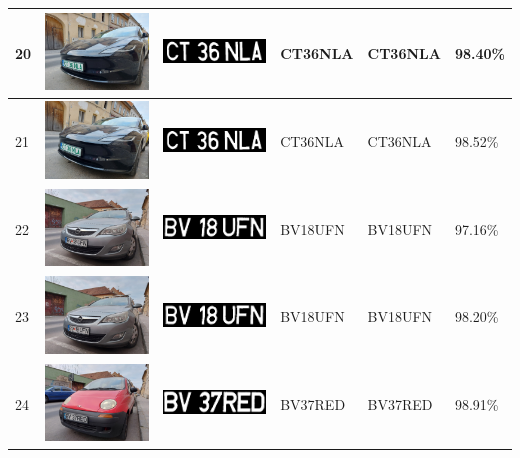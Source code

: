 \documentclass[a4paper,12pt]{report}
\begin{document}
\begin{longtable}{| m{0.6cm} | m{3cm} | m{3cm} | m{1.8cm} | m{1.8cm} | m{1.8cm} |}
        20 & \includegraphics[width=3cm,keepaspectratio]{dataset/10_d2.jpg} & \includegraphics[width=3cm,keepaspectratio]{segmentari/20.jpg} & CT36NLA & CT36NLA & 98.40\% \\ \hline
        21 & \includegraphics[width=3cm,keepaspectratio]{dataset/10_d3.jpg} & \includegraphics[width=3cm,keepaspectratio]{segmentari/21.jpg} & CT36NLA & CT36NLA & 98.52\% \\ \hline
        22 & \includegraphics[width=3cm,keepaspectratio]{dataset/11_d1.jpg} & \includegraphics[width=3cm,keepaspectratio]{segmentari/22.jpg} & BV18UFN & BV18UFN & 97.16\% \\ \hline
        23 & \includegraphics[width=3cm,keepaspectratio]{dataset/11_d2.jpg} & \includegraphics[width=3cm,keepaspectratio]{segmentari/23.jpg} & BV18UFN & BV18UFN & 98.20\% \\ \hline
        24 & \includegraphics[width=3cm,keepaspectratio]{dataset/12_d1.jpg} & \includegraphics[width=3cm,keepaspectratio]{segmentari/24.jpg} & BV37RED & BV37RED & 98.91\% \\ \hline

\end{longtable}
\end{document}
